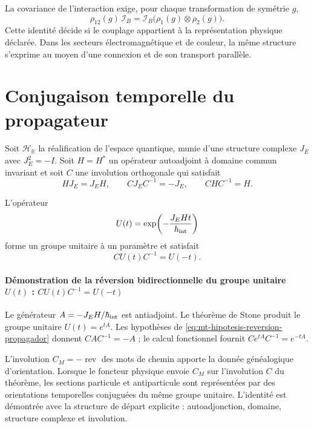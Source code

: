 La covariance de l'interaction exige, pour chaque transformation de symétrie
$g$,
\begin{equation}
 \rho_{12}(g)\,\mathcal I_B
 =\mathcal I_B\bigl(\rho_1(g)\otimes\rho_2(g)\bigr).
 \label{eq:mt-covariancia-interaccion}
\end{equation}
Cette identité décide si le couplage appartient à la représentation
physique déclarée. Dans les secteurs électromagnétique et de couleur, la même
structure s'exprime au moyen d'une connexion et de son transport parallèle.

\section{Conjugaison temporelle du propagateur}

Soit $\mathcal H_{\mathbb R}$ la réalification de l'espace quantique, munie
d'une structure complexe $J_E$ avec $J_E^2=-I$. Soit $H=H^*$ un opérateur
autoadjoint à domaine commun invariant et soit $C$ une involution orthogonale
qui satisfait
\begin{equation}
 HJ_E=J_EH,\qquad
 CJ_EC^{-1}=-J_E,
 \qquad CHC^{-1}=H.
 \label{eq:mt-hipotesis-reversion-propagador}
\end{equation}

\begin{resultado}[title={Théorème : Réversion bidirectionnelle du groupe d'évolution}]
\label{thm:mt-reversion-propagador}
L'opérateur
\begin{equation}
 U(t)=\exp\!\left(-\frac{J_EHt}{\hbar_{\rm int}}\right)
 \label{eq:mt-grupo-evolucion}
\end{equation}
forme un groupe unitaire à un paramètre et satisfait
\begin{equation}
 \boxed{CU(t)C^{-1}=U(-t)}.
 \label{eq:mt-reversion-unitaria}
\end{equation}
\end{resultado}

\paragraph{Démonstration de la réversion bidirectionnelle du groupe unitaire \(U(t)\) : \(CU(t)C^{-1}=U(-t)\)}
Le générateur $A=-J_EH/\hbar_{\rm int}$ est antiadjoint. Le théorème de Stone
produit le groupe unitaire $U(t)=e^{tA}$. Les hypothèses de
\eqref{eq:mt-hipotesis-reversion-propagador} donnent $CAC^{-1}=-A$ ; le calcul
fonctionnel fournit $Ce^{tA}C^{-1}=e^{-tA}$.


L'involution $C_M=-\operatorname{rev}$ des mots de chemin apporte la
donnée généalogique d'orientation. Lorsque le foncteur physique envoie $C_M$ sur
l'involution $C$ du théorème, les sections particule et antiparticule sont
représentées par des orientations temporelles conjuguées du même groupe
unitaire. L'identité est démontrée avec la structure de départ
explicite : autoadjonction, domaine, structure complexe et involution.

